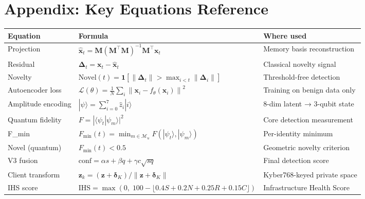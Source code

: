 \documentclass[11pt,a4paper]{article}
\newcommand{\ket}[1]{|#1\rangle}
\newcommand{\braket}[2]{\langle #1|#2\rangle}
\newcommand{\norm}[1]{\left\lVert#1\right\rVert}
\newcommand{\mat}[1]{\mathbf{#1}}
\begin{document}
\section*{Appendix: Key Equations Reference}

\begin{table}[H]
\centering\small
\begin{tabular}{@{}lll@{}}
\toprule
Equation & Formula & Where used \\
\midrule
Projection & $\hat{\mathbf{x}}_t = \mat{M}(\mat{M}^\top\mat{M})^{-1}\mat{M}^\top \mathbf{x}_t$ & Memory basis reconstruction \\
Residual & $\boldsymbol{\Delta}_t = \mathbf{x}_t - \hat{\mathbf{x}}_t$ & Classical novelty signal \\
Novelty & $\text{Novel}(t) = \mathbf{1}[\norm{\boldsymbol{\Delta}_t} > \max_{i<t}\norm{\boldsymbol{\Delta}_i}]$ & Threshold-free detection \\
Autoencoder loss & $\mathcal{L}(\theta) = \frac{1}{N}\sum_i \norm{\mathbf{x}_i - f_\theta(\mathbf{x}_i)}^2$ & Training on benign data only \\
Amplitude encoding & $\ket{\psi} = \sum_{i=0}^{7} \hat{z}_i \ket{i}$ & 8-dim latent → 3-qubit state \\
Quantum fidelity & $F = |\braket{\psi_t}{\psi_m}|^2$ & Core detection measurement \\
F\_min & $F_{\min}(t) = \min_{m \in \mathcal{M}_u} F(\ket{\psi_t}, \ket{\psi_m})$ & Per-identity minimum \\
Novel (quantum) & $F_{\min}(t) < 0.5$ & Geometric novelty criterion \\
V3 fusion & $\text{conf} = \alpha s + \beta q + \gamma c\sqrt{sq}$ & Final detection score \\
Client transform & $\mathbf{z}_k = (\mathbf{z}+\boldsymbol{\delta}_K)/\norm{\mathbf{z}+\boldsymbol{\delta}_K}$ & Kyber768-keyed private space \\
IHS score & $\text{IHS} = \max(0,\; 100 - \lfloor 0.4S + 0.2N + 0.25R + 0.15C\rfloor)$ & Infrastructure Health Score \\
\bottomrule
\end{tabular}
\end{table}
\end{document}
